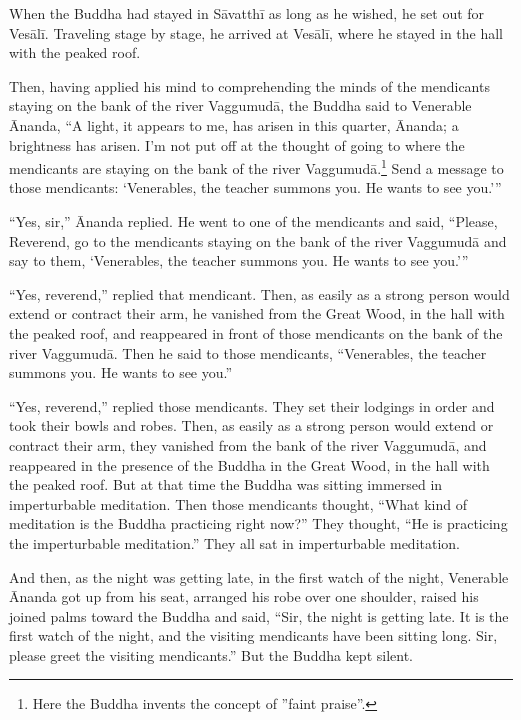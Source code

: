\documentclass[12pt,openany]{book}%
\begin{document}
When the Buddha had stayed in \textsanskrit{Sāvatthī} as long as he wished, he set out for \textsanskrit{Vesālī}. Traveling stage by stage, he arrived at \textsanskrit{Vesālī}, where he stayed in the hall with the peaked roof. 

Then, having applied his mind to comprehending the minds of the mendicants staying on the bank of the river \textsanskrit{Vaggumudā}, the Buddha said to Venerable Ānanda, “A light, it appears to me, has arisen in this quarter, Ānanda; a brightness has arisen. I’m not put off at the thought of going to where the mendicants are staying on the bank of the river \textsanskrit{Vaggumudā}.\footnote{Here the Buddha invents the concept of ”faint praise”. } Send a message to those mendicants: ‘Venerables, the teacher summons you. He wants to see you.’” 

“Yes, sir,” Ānanda replied. He went to one of the mendicants and said, “Please, Reverend, go to the mendicants staying on the bank of the river \textsanskrit{Vaggumudā} and say to them, ‘Venerables, the teacher summons you. He wants to see you.’” 

“Yes, reverend,” replied that mendicant. Then, as easily as a strong person would extend or contract their arm, he vanished from the Great Wood, in the hall with the peaked roof, and reappeared in front of those mendicants on the bank of the river \textsanskrit{Vaggumudā}. Then he said to those mendicants, “Venerables, the teacher summons you. He wants to see you.” 

“Yes, reverend,” replied those mendicants. They set their lodgings in order and took their bowls and robes. Then, as easily as a strong person would extend or contract their arm, they vanished from the bank of the river \textsanskrit{Vaggumudā}, and reappeared in the presence of the Buddha in the Great Wood, in the hall with the peaked roof. But at that time the Buddha was sitting immersed in imperturbable meditation. Then those mendicants thought, “What kind of meditation is the Buddha practicing right now?” They thought, “He is practicing the imperturbable meditation.” They all sat in imperturbable meditation. 

And then, as the night was getting late, in the first watch of the night, Venerable Ānanda got up from his seat, arranged his robe over one shoulder, raised his joined palms toward the Buddha and said, “Sir, the night is getting late. It is the first watch of the night, and the visiting mendicants have been sitting long. Sir, please greet the visiting mendicants.” But the Buddha kept silent. 
\end{document}
